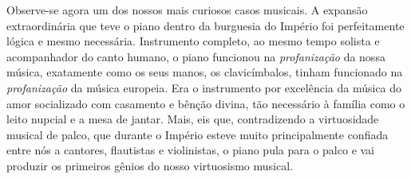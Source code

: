 Observe-se agora um dos nossos mais curiosos casos musicais. A expansão
extraordinária que teve o piano dentro da burguesia do Império foi
perfeitamente lógica e mesmo necessária. Instrumento completo, ao mesmo
tempo solista e acompanhador do canto humano, o piano funcionou na
\textit{profanização} da nossa música, exatamente como os seus manos, os
clavicímbalos, tinham funcionado na \textit{profanização} da música europeia. Era
o instrumento por excelência da música do amor socializado com casamento
e bênção divina, tão necessário à família como o leito nupcial e a mesa
de jantar. Mais, eis que, contradizendo a virtuosidade musical de palco,
que durante o Império esteve muito principalmente confiada entre nós a
cantores, flautistas e violinistas, o piano pula para o palco e vai
produzir os primeiros gênios do nosso virtuosismo musical.

